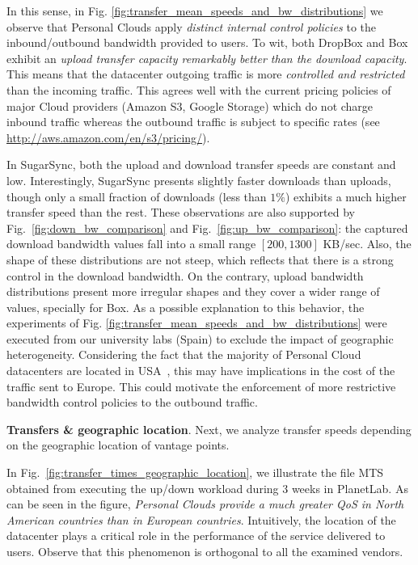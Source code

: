 In this sense, in Fig. \ref{fig:transfer_mean_speeds_and_bw_distributions} we observe  
that Personal Clouds apply \textit{distinct internal control policies}
to the inbound/outbound bandwidth provided to users. To wit,
both DropBox and Box exhibit an \textit{upload transfer capacity remarkably better
than the download capacity}. This means that the datacenter outgoing
traffic is more \textit{controlled and restricted} than the incoming traffic. This agrees
well with the current pricing policies of major Cloud providers (Amazon S3,
Google Storage) which do not charge inbound traffic whereas
the outbound traffic is subject to specific rates (see \url{http://aws.amazon.com/en/s3/pricing/}). 

In SugarSync, both the upload and download transfer speeds are constant and
low. Interestingly, SugarSync presents slightly faster downloads than uploads,
though only a small fraction of downloads (less than $1\%$) exhibits a much
higher transfer speed than the rest. These observations are also supported by Fig.~\ref{fig:down_bw_comparison} and Fig.~\ref{fig:up_bw_comparison}: the captured download
bandwidth values fall into a small range $[200, 1300]$ KB/sec. Also,
the shape of these distributions are not steep, which reflects that there is
a strong control in the download bandwidth.
On the contrary, upload bandwidth distributions present more irregular shapes and
they cover a wider range of values, specially for Box.
As a possible explanation to this behavior, the experiments of Fig. \ref{fig:transfer_mean_speeds_and_bw_distributions} 
were executed from our university labs (Spain) to exclude the impact of geographic heterogeneity. 
Considering the fact that the majority of 
Personal Cloud datacenters are located in USA~\cite{drago2013benchmarking}, 
this may have implications in the cost of the traffic sent to Europe. This could motivate
the enforcement of more restrictive bandwidth control policies to
the outbound traffic.
\medskip

\noindent\textbf{Transfers \& geographic location}. 
Next, we analyze transfer speeds depending
on the geographic location of vantage points. 

In Fig.~\ref{fig:transfer_times_geographic_location},
we illustrate the file MTS obtained from executing the up/down 
workload during $3$ weeks in PlanetLab. 
As can be seen in the figure, \textit{Personal Clouds provide a
much greater QoS in North American countries than in European countries}.
Intuitively, the location of the datacenter plays
a critical role in the performance of the service delivered to users. 
Observe that this phenomenon is orthogonal to all the examined vendors.

